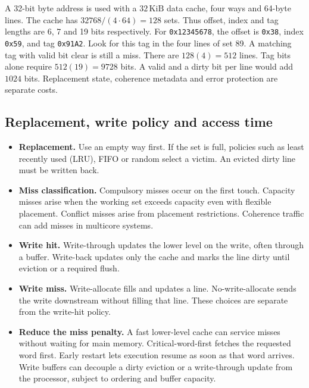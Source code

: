 \documentclass[12pt,a4paper]{article}
\begin{document}
\begin{tcolorbox}[examplebox,title={Decode an address in a four-way cache}]
A 32-bit byte address is used with a $32\,\mathrm{KiB}$ data cache, four ways and 64-byte lines. The cache has $32768/(4\cdot64)=128$ sets. Thus offset, index and tag lengths are 6, 7 and 19 bits respectively. For \texttt{0x12345678}, the offset is \texttt{0x38}, index \texttt{0x59}, and tag \texttt{0x91A2}. Look for this tag in the four lines of set 89. A matching tag with valid bit clear is still a miss.
There are $128(4)=512$ lines. Tag bits alone require $512(19)=9728$ bits. A valid and a dirty bit per line would add $1024$ bits. Replacement state, coherence metadata and error protection are separate costs.
\end{tcolorbox}

\subsection{Replacement, write policy and access time}
\begin{itemize}[leftmargin=*,itemsep=3pt]
\item \textbf{Replacement.} Use an empty way first. If the set is full, policies such as least recently used (LRU), FIFO or random select a victim. An evicted dirty line must be written back.
\item \textbf{Miss classification.} Compulsory misses occur on the first touch. Capacity misses arise when the working set exceeds capacity even with flexible placement. Conflict misses arise from placement restrictions. Coherence traffic can add misses in multicore systems.
\item \textbf{Write hit.} Write-through updates the lower level on the write, often through a buffer. Write-back updates only the cache and marks the line dirty until eviction or a required flush.
\item \textbf{Write miss.} Write-allocate fills and updates a line. No-write-allocate sends the write downstream without filling that line. These choices are separate from the write-hit policy.
\item \textbf{Reduce the miss penalty.} A fast lower-level cache can service misses without waiting for main memory. Critical-word-first fetches the requested word first. Early restart lets execution resume as soon as that word arrives. Write buffers can decouple a dirty eviction or a write-through update from the processor, subject to ordering and buffer capacity.
\end{itemize}
\end{document}
